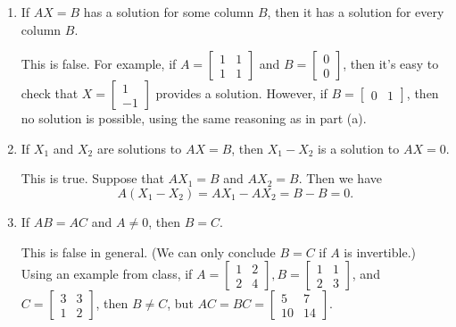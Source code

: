 \documentclass[letterpaper,12pt]{article}
\begin{document}
\begin{enumerate}
\begin{enumerate}
\bigskip

 \item If $AX=B$ has a solution for some column $B$, then it has a solution for every column $B$.

\bigskip

This is false. For example, if $A = \begin{bmatrix}1&1\\1&1\end{bmatrix}$ and $B = \begin{bmatrix}0\\0\end{bmatrix}$, then it's easy to check that $X = \begin{bmatrix}1\\-1\end{bmatrix}$ provides a solution. However, if $B=\begin{bmatrix}0&1\end{bmatrix}$, then no solution is possible, using the same reasoning as in part (a).

\bigskip

 \item If $X_1$ and $X_2$ are solutions to $AX=B$, then $X_1-X_2$ is a solution to $AX=0$.

\bigskip

This is true. Suppose that $AX_1=B$ and $AX_2=B$. Then we have
\[
 A(X_1-X_2) = AX_1-AX_2 = B-B=0.
\]

\bigskip

 \item If $AB=AC$ and $A\neq 0$, then $B=C$.

\bigskip

This is false in general. (We can only conclude $B=C$ if $A$ is invertible.) Using an example from class, if $A = \begin{bmatrix}1&2\\2&4\end{bmatrix}, B = \begin{bmatrix}1&1\\2&3\end{bmatrix}$, and $C = \begin{bmatrix}3&3\\1&2\end{bmatrix}$, then $B\neq C$, but $AC=BC=\begin{bmatrix}5&7\\10&14\end{bmatrix}$.

\bigskip


\end{enumerate}
\end{enumerate}
\end{document}

